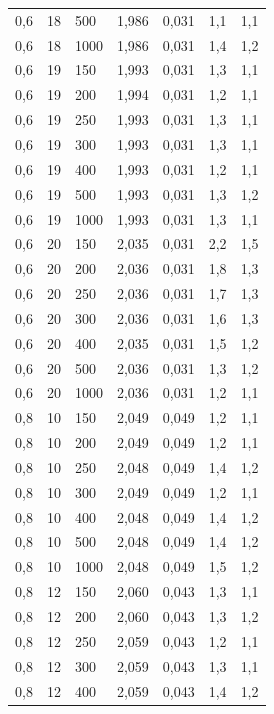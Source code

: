 \begin{tabular}{lllllll}
        0,6 & 18 & 500 & 1,986 & 0,031 & 1,1 & 1,1 \\ 
        0,6 & 18 & 1000 & 1,986 & 0,031 & 1,4 & 1,2 \\ 
        0,6 & 19 & 150 & 1,993 & 0,031 & 1,3 & 1,1 \\ 
        0,6 & 19 & 200 & 1,994 & 0,031 & 1,2 & 1,1 \\ 
        0,6 & 19 & 250 & 1,993 & 0,031 & 1,3 & 1,1 \\ 
        0,6 & 19 & 300 & 1,993 & 0,031 & 1,3 & 1,1 \\ 
        0,6 & 19 & 400 & 1,993 & 0,031 & 1,2 & 1,1 \\ 
        0,6 & 19 & 500 & 1,993 & 0,031 & 1,3 & 1,2 \\ 
        0,6 & 19 & 1000 & 1,993 & 0,031 & 1,3 & 1,1 \\ 
        0,6 & 20 & 150 & 2,035 & 0,031 & 2,2 & 1,5 \\ 
        0,6 & 20 & 200 & 2,036 & 0,031 & 1,8 & 1,3 \\ 
        0,6 & 20 & 250 & 2,036 & 0,031 & 1,7 & 1,3 \\ 
        0,6 & 20 & 300 & 2,036 & 0,031 & 1,6 & 1,3 \\ 
        0,6 & 20 & 400 & 2,035 & 0,031 & 1,5 & 1,2 \\ 
        0,6 & 20 & 500 & 2,036 & 0,031 & 1,3 & 1,2 \\ 
        0,6 & 20 & 1000 & 2,036 & 0,031 & 1,2 & 1,1 \\ 
        0,8 & 10 & 150 & 2,049 & 0,049 & 1,2 & 1,1 \\ 
        0,8 & 10 & 200 & 2,049 & 0,049 & 1,2 & 1,1 \\ 
        0,8 & 10 & 250 & 2,048 & 0,049 & 1,4 & 1,2 \\ 
        0,8 & 10 & 300 & 2,049 & 0,049 & 1,2 & 1,1 \\ 
        0,8 & 10 & 400 & 2,048 & 0,049 & 1,4 & 1,2 \\ 
        0,8 & 10 & 500 & 2,048 & 0,049 & 1,4 & 1,2 \\ 
        0,8 & 10 & 1000 & 2,048 & 0,049 & 1,5 & 1,2 \\ 
        0,8 & 12 & 150 & 2,060 & 0,043 & 1,3 & 1,1 \\ 
        0,8 & 12 & 200 & 2,060 & 0,043 & 1,3 & 1,2 \\ 
        0,8 & 12 & 250 & 2,059 & 0,043 & 1,2 & 1,1 \\ 
        0,8 & 12 & 300 & 2,059 & 0,043 & 1,3 & 1,1 \\ 
        0,8 & 12 & 400 & 2,059 & 0,043 & 1,4 & 1,2 \\ 

\end{tabular}
